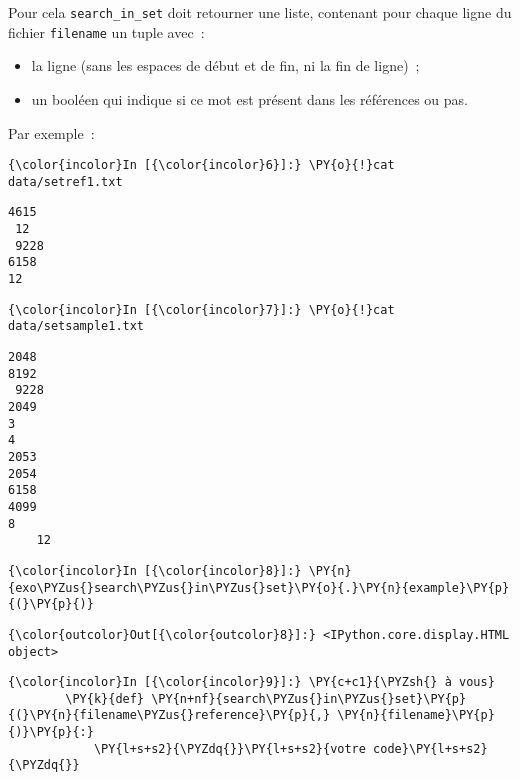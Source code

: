 Pour cela \texttt{search\_in\_set} doit retourner une liste, contenant
pour chaque ligne du fichier \texttt{filename} un tuple avec~:

\begin{itemize}
\tightlist
\item
  la ligne (sans les espaces de début et de fin, ni la fin de ligne)~;
\item
  un booléen qui indique si ce mot est présent dans les références ou
  pas.
\end{itemize}

Par exemple~:

    \begin{Verbatim}[commandchars=\\\{\}]
{\color{incolor}In [{\color{incolor}6}]:} \PY{o}{!}cat data/setref1.txt
\end{Verbatim}


    \begin{Verbatim}[commandchars=\\\{\}]
4615
 12
 9228
6158
12

    \end{Verbatim}

    \begin{Verbatim}[commandchars=\\\{\}]
{\color{incolor}In [{\color{incolor}7}]:} \PY{o}{!}cat data/setsample1.txt
\end{Verbatim}


    \begin{Verbatim}[commandchars=\\\{\}]
2048
8192
 9228
2049
3
4
2053
2054
6158  
4099
8
    12

    \end{Verbatim}

    \begin{Verbatim}[commandchars=\\\{\}]
{\color{incolor}In [{\color{incolor}8}]:} \PY{n}{exo\PYZus{}search\PYZus{}in\PYZus{}set}\PY{o}{.}\PY{n}{example}\PY{p}{(}\PY{p}{)}
\end{Verbatim}


\begin{Verbatim}[commandchars=\\\{\}]
{\color{outcolor}Out[{\color{outcolor}8}]:} <IPython.core.display.HTML object>
\end{Verbatim}
            
    \begin{Verbatim}[commandchars=\\\{\}]
{\color{incolor}In [{\color{incolor}9}]:} \PY{c+c1}{\PYZsh{} à vous}
        \PY{k}{def} \PY{n+nf}{search\PYZus{}in\PYZus{}set}\PY{p}{(}\PY{n}{filename\PYZus{}reference}\PY{p}{,} \PY{n}{filename}\PY{p}{)}\PY{p}{:}
            \PY{l+s+s2}{\PYZdq{}}\PY{l+s+s2}{votre code}\PY{l+s+s2}{\PYZdq{}}
\end{Verbatim}


